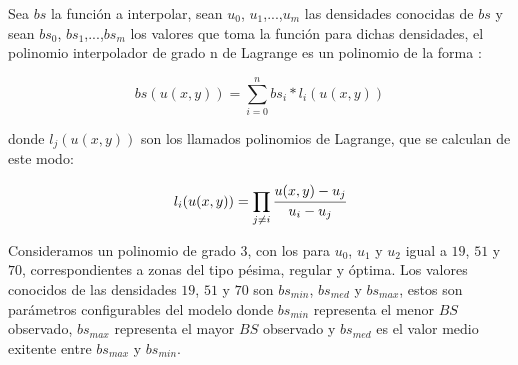 Sea $bs$ la función a interpolar, sean $u_0$, $u_1$,...,$u_m$ las densidades conocidas de $bs$ y
sean $bs_0$, $bs_1$,...,$bs_m$ los valores que toma la función para dichas densidades, el polinomio interpolador de grado n de Lagrange es un polinomio de la forma :

\begin{equation}
\label{eq:sitios-reproduccion-x-y}
    bs(u(x,y)) = \sum_{i=0}^{n} bs_{i} * l_{i}(u(x,y))
\end{equation}

donde $l_j(u(x,y))$ son los llamados polinomios de Lagrange, que se calculan de este modo:

\begin{equation}
\label{eq:sitios-reproduccion-x-y}
    l_{i}(u(x,y)) = \prod_{j \neq i} \cfrac{u(x,y) - u_{j}}{u_{i} - u_{j}}
\end{equation}

Consideramos un polinomio de grado 3, con los para $u_0$, $u_1$ y $u_2$ igual a $19$, $51$ y $70$,
correspondientes a zonas del tipo pésima, regular y óptima. Los valores conocidos de las densidades
$19$, $51$ y $70$ son $bs_{min}$, $bs_{med}$ y $bs_{max}$, estos son parámetros configurables del
modelo donde $bs_{min}$ representa el menor $BS$ observado, $bs_{max}$ representa el mayor $BS$
observado y  $bs_{med}$ es el valor medio exitente entre $bs_{max}$ y $bs_{min}$.

